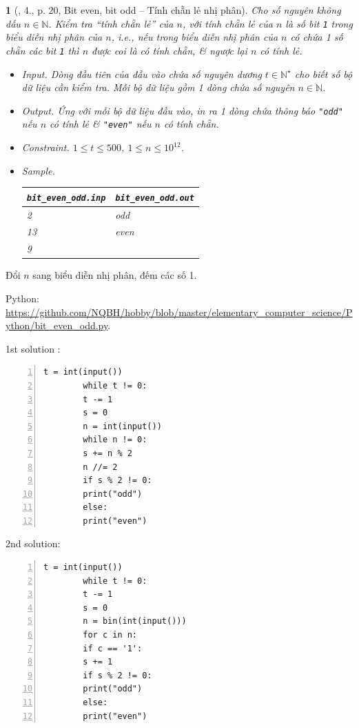 \documentclass{article}
\newtheorem{baitoan}{}
\begin{document}
\begin{baitoan}[\cite{Duc_200_BT_Python}, 4., p. 20, Bit even, bit odd -- Tính chẵn lẻ nhị phân]
	Cho số nguyên không dấu $n\in\mathbb{N}$. Kiểm tra ``tính chẵn lẻ'' của $n$, với \emph{tính chẵn lẻ} của $n$ là số bit {\tt1} trong biểu diễn nhị phân của $n$, i.e., nếu trong biểu diễn nhị phân của $n$ có chứa 1 số chẵn các bit {\tt1} thì $n$ được coi là có tính chẵn, \& ngược lại $n$ có tính lẻ.
	\begin{itemize}
		\item {\sf Input.} Dòng đầu tiên của đầu vào chứa số nguyên dương $t\in\mathbb{N}^\star$ cho biết số bộ dữ liệu cần kiểm tra. Mỗi bộ dữ liệu gồm 1 dòng chứa số nguyên $n\in\mathbb{N}$.
		\item {\sf Output.} Ứng với mỗi bộ dữ liệu đầu vào, in ra 1 dòng chứa thông báo {\tt"odd"} nếu $n$ có tính lẻ \& {\tt"even"} nếu $n$ có tính chẵn.
		\item {\sf Constraint.} $1\le t\le500$, $1\le n\le10^{12}$.
		\item {\sf Sample.}
		\begin{table}[H]
			\centering
			\begin{tabular}{|l|l|}
				\hline
				\verb|bit_even_odd.inp| & \verb|bit_even_odd.out| \\
				\hline
				2 & odd \\
				13 & even \\
				9 & \\
				\hline
			\end{tabular}
		\end{table}
	\end{itemize}
\end{baitoan}
Đổi $n$ sang biểu diễn nhị phân, đếm các số 1.

\noindent Python: \url{https://github.com/NQBH/hobby/blob/master/elementary_computer_science/Python/bit_even_odd.py}.
\begin{multicols}{2}
	1st solution \cite[4., p. 204]{Duc_200_BT_Python}:
	\begin{Verbatim}[numbers=left,xleftmargin=5mm]
		t = int(input())
		while t != 0:
		t -= 1
		s = 0
		n = int(input())
		while n != 0:
		s += n % 2
		n //= 2
		if s % 2 != 0:
		print("odd")
		else:
		print("even")
	\end{Verbatim}
	\columnbreak
	2nd solution:
	\begin{Verbatim}[numbers=left,xleftmargin=5mm]
		t = int(input())
		while t != 0:
		t -= 1
		s = 0
		n = bin(int(input()))
		for c in n:
		if c == '1':
		s += 1
		if s % 2 != 0:
		print("odd")
		else:
		print("even")
	\end{Verbatim}
\end{multicols}
\end{document}
